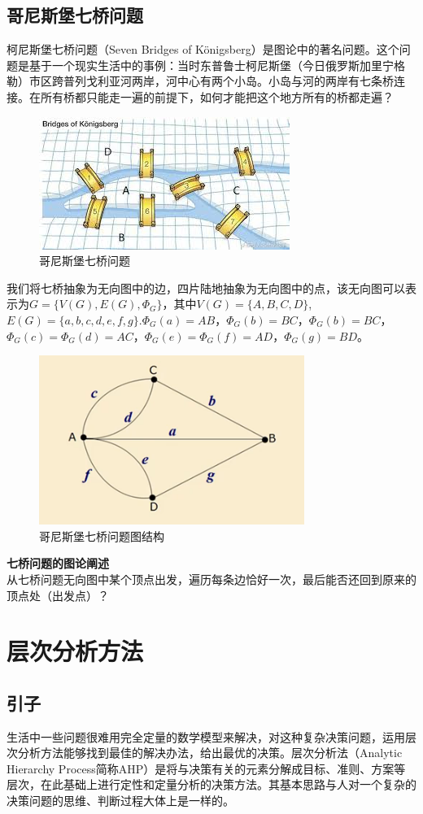 \documentclass[openany]{progbookcn}
\begin{document}
\subsection{哥尼斯堡七桥问题}
柯尼斯堡七桥问题（Seven Bridges of Königsberg）是图论中的著名问题。这个问题是基于一个现实生活中的事例：当时东普鲁士柯尼斯堡（今日俄罗斯加里宁格勒）市区跨普列戈利亚河两岸，河中心有两个小岛。小岛与河的两岸有七条桥连接。在所有桥都只能走一遍的前提下，如何才能把这个地方所有的桥都走遍？
\begin{figure}[H]
\centering
\includegraphics[width=0.6 \textwidth]{figs/chapter3/哥尼斯堡七桥问题}
\caption{哥尼斯堡七桥问题}
\end{figure}
\indent 我们将七桥抽象为无向图中的边，四片陆地抽象为无向图中的点，该无向图可以表示为$G=\{V(G),E(G),\Phi_G\}$，其中$V(G)=\{A,B,C,D\}$,$E(G)=\{a,b,c,d,e,f,g\}$.$\Phi_G(a)=AB$，$\Phi_G(b)=BC$，$\Phi_G(b)=BC$，$\Phi_G(c)=\Phi_G(d)=AC$，$\Phi_G(e)=\Phi_G(f)=AD$，$\Phi_G(g)=BD$。
\begin{figure}[H]
\centering
\includegraphics[width=0.6 \textwidth]{figs/chapter3/哥尼斯堡七桥拓扑}
\caption{哥尼斯堡七桥问题图结构}
\end{figure}

\noindent \textbf{七桥问题的图论阐述}\\
\indent 从七桥问题无向图中某个顶点出发，遍历每条边恰好一次，最后能否还回到原来的顶点处（出发点）？


\section{层次分析方法}
\subsection{引子}
\indent 生活中一些问题很难用完全定量的数学模型来解决，对这种复杂决策问题，运用层次分析方法能够找到最佳的解决办法，给出最优的决策。层次分析法（Analytic Hierarchy Process简称AHP）是将与决策有关的元素分解成目标、准则、方案等层次，在此基础上进行定性和定量分析的决策方法。其基本思路与人对一个复杂的决策问题的思维、判断过程大体上是一样的。
\end{document}
